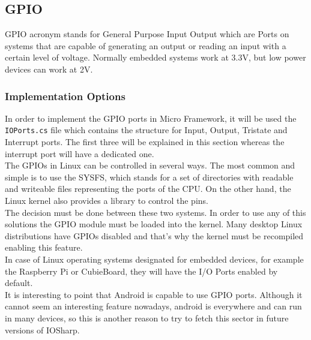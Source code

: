 \subsection{GPIO}\label{SS:GPIO}
GPIO acronym stands for General Purpose Input Output which are Ports on systems that are capable of generating an output or reading an input with a certain level of voltage. Normally embedded systems work at 3.3V, but low power devices can work at 2V.

\subsubsection{Implementation Options}\label{SSS:Implementation-Options}
In order to implement the GPIO ports in Micro Framework, it will be used the \verb!IOPorts.cs! file which contains the structure for Input, Output, Tristate and Interrupt ports. The first three will be explained in this section whereas the interrupt port will have a dedicated one.
\\
The GPIOs in Linux can be controlled in several ways. The most common and simple is to use the \gls{SYSFS}, which stands for a set of directories with readable and writeable files representing the ports of the CPU. On the other hand, the Linux kernel also provides a library to control the pins.
\\
The decision must be done between these two systems. In order to use any of this solutions the GPIO module must be loaded into the kernel. Many desktop Linux distributions have GPIOs disabled and that's why the kernel must be recompiled enabling this feature.
\\
In case of Linux operating systems designated for embedded devices, for example the Raspberry Pi or CubieBoard, they will have the I/O Ports enabled by default.
\\
It is interesting to point that Android is capable to use GPIO ports. Although it cannot seem an interesting feature nowadays, android is everywhere and can run in many devices, so this is another reason to try to fetch this sector in future versions of IOSharp.

